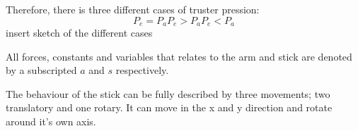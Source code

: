 		Therefore, there is three different cases of truster pression:
		\begin{equation}
		P_{e} = P_{a}
		P_{e} > P_{a}
		P_{e} < P_{a}
		\end{equation}
		 insert sketch of the different cases
		 
		
		\startexplain
		\stopexplain
		All forces, constants and variables that relates to the arm and stick are denoted by a subscripted $a$ and $s$ respectively. 
		
		The behaviour of the stick can be fully described by three movements; two translatory and one rotary. It can move in the x and y direction and rotate around it's own axis.
		
